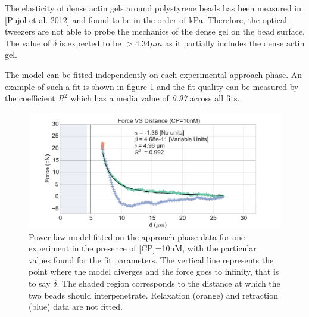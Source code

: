 \documentclass[A4paperpaper,11pt,english]{sphinxmanual}
\begin{document}
The elasticity of dense actin gels around polystyrene beads has been measured
in {\hyperref[index-latex:pujol2012]{{[}Pujol et al. 2012{]}}} and found to be in the order of kPa.  Therefore, the
optical tweezers are not able to probe the mechanics of the dense gel on the
bead surface. The value of \(\delta\)  is expected to be \(> 4.34 \mu{}m\) as it partially includes the dense actin gel.

The model can be fitted independently on each experimental
approach phase. An example of such a fit is shown in
\hyperref[index-latex:force-distance-fit]{figure  \ref*{index-latex:force-distance-fit}} and the fit quality can be measured by the
coefficient \(R^2\) which has a media value of \emph{0.97}
across all fits.
\begin{figure}[htbp]
\centering
\capstart

\includegraphics[width=1.000\linewidth]{force-distance-fit.pdf}
\caption{Power law model fitted on the approach phase data for one experiment in the
presence of {[}CP{]}=10nM, with the particular values found for the fit
parameters.  The vertical line represents the point where the model
diverges and the force goes to infinity, that is to say \(\delta\). The
shaded region corresponds to the distance at which the two beads should
interpenetrate. Relaxation (orange) and retraction (blue) data are not fitted.}\label{index-latex:force-distance-fit}\end{figure}
\end{document}
